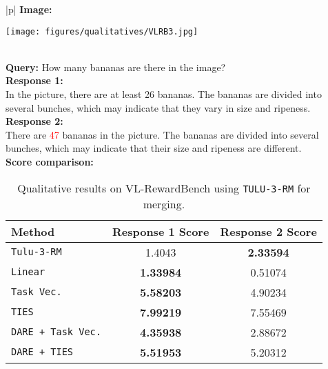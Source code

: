 \begin{table*}[hbtp]
    \begin{center}
        \begin{tabular}{|p{\textwidth}|}
        \hline
        \textbf{Image:}
        \begin{center}
            \texttt{[image: figures/qualitatives/VLRB3.jpg]}
        \end{center} \\
        \hline
        \textbf{Query:} How many bananas are there in the image? \\
        \hline
        \textbf{Response 1:} \\
        In the picture, there are at least 26 bananas. The bananas are divided into several bunches, which may indicate that they vary in size and ripeness. \\
        \hline
        \textbf{Response 2:} \\
        There are \textcolor{Red}{47} bananas in the picture. The bananas are divided into several bunches, which may indicate that their size and ripeness are different. \\
        \hline
        \textbf{Score comparison:}
        \begin{center}
            \begin{tabular}{|l|c|c|}
                \hline
                \textbf{Method} & \textbf{Response 1 Score} & \textbf{Response 2 Score} \\
                \hline
                \texttt{Tulu-3-RM} & 1.4043 & \textbf{2.33594} \\
                \texttt{Linear} & \textbf{1.33984} & 0.51074 \\
                \texttt{Task Vec.} & \textbf{5.58203} & 4.90234 \\
                \texttt{TIES} & \textbf{7.99219} & 7.55469 \\
                \texttt{DARE + Task Vec.} & \textbf{4.35938} & 2.88672 \\
                \texttt{DARE + TIES} & \textbf{5.51953} & 5.20312 \\
                \hline
            \end{tabular} \\
        \end{center} \\
        \hline
        \end{tabular}
    \end{center}
    \caption{Qualitative results on VL-RewardBench using \texttt{TULU-3-RM} for merging.} 
    \label{tab:qualitative_results_3}
\end{table*}